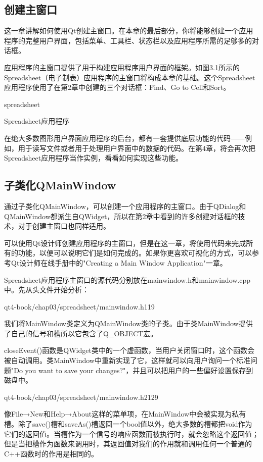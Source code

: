 \documentclass[11pt,oneside]{book}
\begin{document}
\begin{common-format}
\chapter{创建主窗口}
这一章讲解如何使用Qt创建主窗口。在本章的最后部分，你将能够创建一个应用程序的完整用户界面，包括菜单、工具栏、状态栏以及应用程序所需的足够多的对话框。

应用程序的主窗口提供了用于构建应用程序用户界面的框架。如图3.1所示的Spreadsheet（电子制表）应用程序的主窗口将构成本章的基础。这个Spreadsheet应用程序使用了在第2章中创建的三个对话框：Find、Go to Cell和Sort。
\begin{linefig}[0.9]{spreadsheet}
\caption{Spreadsheet应用程序}
\label{fig:spreadsheet}
\end{linefig}

在绝大多数图形用户界面应用程序的后台，都有一套提供底层功能的代码——例如，用于读写文件或者用于处理用户界面中的数据的代码。在第4章，将会再次把Spreadsheet应用程序当作实例，看看如何实现这些功能。

\section{子类化QMainWindow}
通过子类化QMainWindow，可以创建一个应用程序的主窗口。由于QDialog和QMainWindow都派生自QWidget，所以在第2章中看到的许多创建对话框的技术，对于创建主窗口也同样适用。

可以使用Qt设计师创建应用程序的主窗口，但是在这一章，将使用代码来完成所有的功能，以便可以说明它们是如何完成的。如果你更喜欢可视化的方式，可以参考Qt设计师在线手册中的"Creating a Main Window Application"一章。

Spreadsheet应用程序主窗口的源代码分别放在mainwindow.h和mainwindow.cpp中。先从头文件开始分析：
\begin{cppline}{qt4-book/chap03/spreadsheet/mainwindow.h}{1}{19}
\end{cppline}

我们将MainWindow类定义为QMainWindow类的子类。由于类MainWindow提供了自己的信号和槽所以它包含了Q\_{}OBJECT宏。

closeEvent()函数是QWidget类中的一个虚函数，当用户关闭窗口时，这个函数会被自动调用。类MainWindow中重新实现了它，这样就可以向用户询问一个标准问题"Do you want to save your changes?"，并且可以把用户的一些偏好设置保存到磁盘中。

\begin{cppline}{qt4-book/chap03/spreadsheet/mainwindow.h}{21}{29}
\end{cppline}

像File→New和Help→About这样的菜单项，在MainWindow中会被实现为私有槽。除了save()槽和saveAs()槽返回一个bool值以外，绝大多数的槽都把void作为它们的返回值。当槽作为一个信号的响应函数而被执行时，就会忽略这个返回值；但是当把槽作为函数来调用时，其返回值对我们的作用就和调用任何一个普通的C++函数时的作用是相同的。


\end{common-format}
\end{document}
